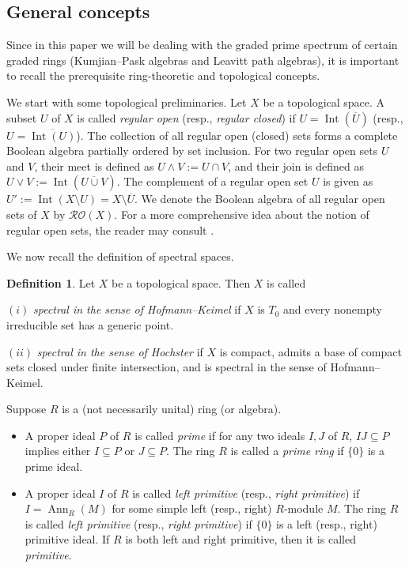 \documentclass[a4paper,reqno,12pt]{amsart}
\numberwithin{equation}{section}
\theoremstyle{definition}
\newtheorem{dfn}[thm]{Definition}
\theoremstyle{remark}
\newcommand{\Int}{\operatorname{Int}}
\newcommand{\Ann}{\operatorname{Ann}}
\begin{document}
\subsection{General concepts} Since in this paper we will be dealing with the graded prime spectrum of certain graded rings (Kumjian--Pask algebras and Leavitt path algebras), it is important to recall the prerequisite ring-theoretic and topological concepts.

We start with some topological preliminaries. Let $X$ be a topological space. A subset $U$ of $X$ is called \emph{regular open} (resp., \emph{regular closed}) if $U=\Int(\overline{U})$ (resp., $U=\overline{\Int(U)}$). The collection of all regular open (closed) sets forms a complete Boolean algebra partially ordered by set inclusion. For two regular open sets $U$ and $V$, their meet is defined as $U\wedge V:=U\cap V$, and their join is defined as $U\vee V:=\Int(\overline{U\cup V})$. The complement of a regular open set $U$ is given as $U':=\Int(X\setminus U)=X\setminus \overline{U}$. We denote the Boolean algebra of all regular open sets of $X$ by $\mathcal{R}\mathcal{O}(X)$. For a more comprehensive idea about the notion of regular open sets, the reader may consult \cite[Chapter 9--10]{BooleanBook}.

We now recall the definition of spectral spaces.

\begin{dfn}\label{def spectral spaces}
Let $X$ be a topological space. Then $X$ is called

$(i)$ \emph{spectral in the sense of Hofmann--Keimel} \cite{HofKei} if $X$ is $T_0$ and every nonempty irreducible set has a generic point.

$(ii)$ \emph{spectral in the sense of Hochster} \cite{Hochster} if $X$ is compact, admits a base of compact sets closed under finite intersection, and is spectral in the sense of Hofmann--Keimel.
\end{dfn}

Suppose $R$ is a (not necessarily unital) ring (or algebra). 

\begin{itemize}
    \item[$(i)$] A proper ideal $P$ of $R$ is called \emph{prime} if for any two ideals $I,J$ of $R$, $IJ\subseteq P$ implies either $I\subseteq P$ or $J\subseteq P$. The ring $R$ is called a \emph{prime ring} if $\{0\}$ is a prime ideal.

    \item[$(ii)$] A proper ideal $I$ of $R$ is called \emph{left primitive} (resp., \emph{right primitive}) if $I=\Ann_R(M)$ for some simple left (resp., right) $R$-module $M$. The ring $R$ is called \emph{left primitive} (resp., \emph{right primitive}) if $\{0\}$ is a left (resp., right) primitive ideal. If $R$ is both left and right primitive, then it is called \emph{primitive}. 
\end{itemize}
\end{document}
